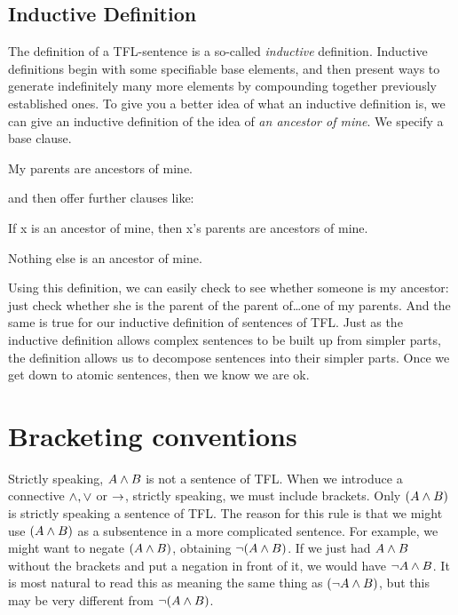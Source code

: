 \subsection{Inductive Definition}
The definition of a TFL-sentence is a so-called \emph{inductive} definition. Inductive definitions begin with some specifiable base elements, and then present ways to generate indefinitely many more elements by compounding together previously established ones. To give you a better idea of what an inductive definition is, we can give an inductive definition of the idea of \emph{an ancestor of mine}. We specify a base clause.
	\begin{ebullet}
		\item My parents are ancestors of mine.
	\end{ebullet}
and then offer further clauses like:
	\begin{ebullet}
		\item If x is an ancestor of mine, then x's parents are ancestors of mine.
		\item Nothing else is an ancestor of mine.
	\end{ebullet}
Using this definition, we can easily check to see whether someone is my ancestor: just check whether she is the parent of the parent of\ldots one of my parents. And the same is true for our inductive definition of sentences of TFL. Just as the inductive definition allows complex sentences to be built up from simpler parts, the definition allows us to decompose sentences into their simpler parts. Once we get down to atomic sentences, then we know we are ok.

\section{Bracketing conventions}
\label{TFLconventions}


Strictly speaking, $A\mathbin{\wedge} B$ is not a sentence of TFL. When we introduce a connective $\mathbin{\wedge},\vee$ or $\rightarrow$, strictly speaking, we must include brackets. Only $(A\mathbin{\wedge} B)$ is strictly speaking a sentence of TFL. The reason for this rule is that we might use $(A\mathbin{\wedge} B)$ as a subsentence in a more complicated sentence. For example, we might want to negate $(A\mathbin{\wedge} B)$, obtaining $\neg(A\mathbin{\wedge} B)$. If we just had $A \mathbin{\wedge} B$ without the brackets and put a negation in front of it, we would have $\neg A \mathbin{\wedge} B$. It is most natural to read this as meaning the same thing as $(\neg A \mathbin{\wedge} B)$, but this may be very different from $\neg(A\mathbin{\wedge} B)$.

